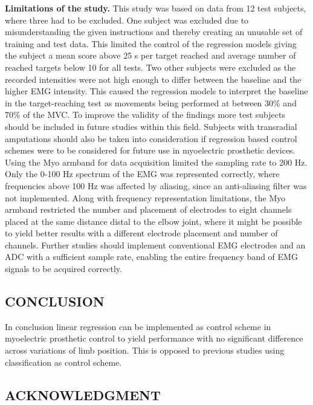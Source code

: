 \begin{multicols}{2}
\textbf{Limitations of the study.} This study was based on data from 12 test subjects, where three had to be excluded. One subject was excluded due to misunderstanding the given instructions and thereby creating an unusable set of training and test data. This limited the control of the regression models giving the subject a mean score above 25 s per target reached and average number of reached targets below 10 for all tests.
Two other subjects were excluded as the recorded intensities were not high enough to differ between the baseline and the higher EMG intensity. This caused the regression models to interpret the baseline in the target-reaching test as movements being performed at between 30\% and 70\% of the MVC. 
To improve the validity of the findings more test subjects should be included in future studies within this field. Subjects with transradial amputations should also be taken into consideration if regression based control schemes were to be considered for future use in myoelectric prosthetic devices. 
Using the Myo armband for data acquisition limited the sampling rate to 200 Hz. Only the 0-100 Hz spectrum of the EMG was represented correctly, where frequencies above 100 Hz was affected by aliasing, since an anti-aliasing filter was not implemented. Along with frequency representation limitations, the Myo armband restricted the number and placement of electrodes to eight channels placed at the same distance distal to the elbow joint, where it might be possible to yield better results with a different electrode placement and number of channels. Further studies should implement conventional EMG electrodes and an ADC with a sufficient sample rate, enabling the entire frequency band of EMG signals to be acquired correctly.		
	
\subsection*{CONCLUSION}%
	
% 		
In conclusion linear regression can be implemented as control scheme in myoelectric prosthetic control to yield performance with no significant difference across variations of limb position. This is opposed to previous studies using classification as control scheme.
 		
	
	
	
	\subsection*{ACKNOWLEDGMENT}
	

\end{multicols}
